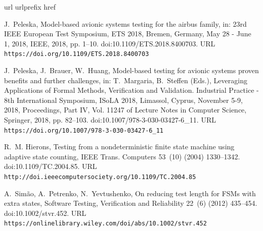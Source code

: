 \documentclass[3p,times]{elsarticle}
\begin{document}
\begin{thebibliography}{10}
\expandafter\ifx\csname url\endcsname\relax
  \def\url#1{\texttt{#1}}\fi
\expandafter\ifx\csname urlprefix\endcsname\relax\def\urlprefix{URL }\fi
\expandafter\ifx\csname href\endcsname\relax
  \def\href#1#2{#2} \def\path#1{#1}\fi

J.~Peleska, \href{https://doi.org/10.1109/ETS.2018.8400703}{Model-based avionic
  systems testing for the airbus family}, in: 23rd {IEEE} European Test
  Symposium, {ETS} 2018, Bremen, Germany, May 28 - June 1, 2018, {IEEE}, 2018,
  pp. 1--10.
\newblock \href {http://dx.doi.org/10.1109/ETS.2018.8400703}
  {\path{doi:10.1109/ETS.2018.8400703}}.
\newline\urlprefix\url{https://doi.org/10.1109/ETS.2018.8400703}

J.~Peleska, J.~Brauer, W.~Huang,
  \href{https://doi.org/10.1007/978-3-030-03427-6\_11}{Model-based testing for
  avionic systems proven benefits and further challenges}, in: T.~Margaria,
  B.~Steffen (Eds.), Leveraging Applications of Formal Methods, Verification
  and Validation. Industrial Practice - 8th International Symposium, ISoLA
  2018, Limassol, Cyprus, November 5-9, 2018, Proceedings, Part {IV}, Vol.
  11247 of Lecture Notes in Computer Science, Springer, 2018, pp. 82--103.
\newblock \href {http://dx.doi.org/10.1007/978-3-030-03427-6\_11}
  {\path{doi:10.1007/978-3-030-03427-6\_11}}.
\newline\urlprefix\url{https://doi.org/10.1007/978-3-030-03427-6\_11}

R.~M. Hierons,
  \href{http://doi.ieeecomputersociety.org/10.1109/TC.2004.85}{Testing from a
  nondeterministic finite state machine using adaptive state counting}, {IEEE}
  Trans. Computers 53~(10) (2004) 1330--1342.
\newblock \href {http://dx.doi.org/10.1109/TC.2004.85}
  {\path{doi:10.1109/TC.2004.85}}.
\newline\urlprefix\url{http://doi.ieeecomputersociety.org/10.1109/TC.2004.85}

A.~Sim{\~{a}}o, A.~Petrenko, N.~Yevtushenko,
  \href{https://onlinelibrary.wiley.com/doi/abs/10.1002/stvr.452}{On reducing
  test length for {FSMs} with extra states}, Software Testing, Verification and
  Reliability 22~(6) (2012) 435--454.
\newblock \href {http://dx.doi.org/10.1002/stvr.452}
  {\path{doi:10.1002/stvr.452}}.
\newline\urlprefix\url{https://onlinelibrary.wiley.com/doi/abs/10.1002/stvr.452}


\end{thebibliography}
\end{document}
